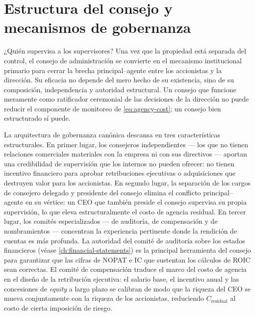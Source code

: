 \section{Estructura del consejo y mecanismos de gobernanza}\label{sec:board-governance}

¿Quién supervisa a los supervisores? Una vez que la propiedad está separada del control, el consejo de administración se convierte en el mecanismo institucional primario para cerrar la brecha principal--agente entre los accionistas y la dirección. Su eficacia no depende del mero hecho de su existencia, sino de su composición, independencia y autoridad estructural. Un consejo que funcione meramente como ratificador ceremonial de las decisiones de la dirección no puede reducir el componente de monitoreo de \cref{eq:agency-cost}; un consejo bien estructurado sí puede.

La arquitectura de gobernanza canónica descansa en tres características estructurales. En primer lugar, los consejeros independientes --- los que no tienen relaciones comerciales materiales con la empresa ni con sus directivos --- aportan una credibilidad de supervisión que los internos no pueden ofrecer: no tienen incentivo financiero para aprobar retribuciones ejecutivas o adquisiciones que destruyen valor para los accionistas. En segundo lugar, la separación de los cargos de consejero delegado y presidente del consejo elimina el conflicto principal--agente en su vértice: un CEO que también preside el consejo supervisa su propia supervisión, lo que eleva estructuralmente el costo de agencia residual. En tercer lugar, los comités especializados --- de auditoría, de compensación y de nombramientos --- concentran la experiencia pertinente donde la rendición de cuentas es más profunda. La autoridad del comité de auditoría sobre los estados financieros (véase \cref{ch:financial-statements}) es la principal herramienta del consejo para garantizar que las cifras de NOPAT e IC que sustentan los cálculos de ROIC sean correctas. El comité de compensación traduce el marco del costo de agencia en el diseño de la retribución ejecutiva: el salario base, el incentivo anual y las concesiones de \emph{equity} a largo plazo se calibran de modo que la riqueza del CEO se mueva conjuntamente con la riqueza de los accionistas, reduciendo \(C_{\text{residual}}\) al costo de cierta imposición de riesgo.

